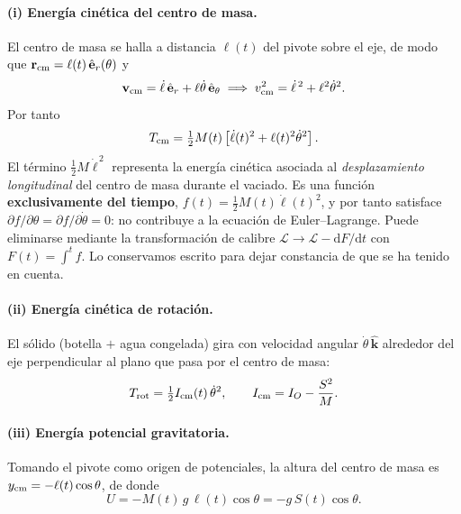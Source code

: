 \documentclass[11pt,a4paper]{article}
\newcommand{\dd}{\mathrm{d}}
\begin{document}
\paragraph{(i) Energía cinética del centro de masa.}
El centro de masa se halla a distancia $\ell(t)$ del pivote sobre el eje, de modo que
$\mathbf r_{\rm cm} = \ell(t)\,\hat{\mathbf e}_r(\theta)$ y
\begin{equation}
\mathbf v_{\rm cm} = \dot\ell\,\hat{\mathbf e}_r + \ell\dot\theta\,\hat{\mathbf e}_\theta
\;\Longrightarrow\;
v_{\rm cm}^2 = \dot\ell^{\,2} + \ell^2\dot\theta^2 .
\end{equation}
Por tanto
\begin{equation}
T_{\rm cm} = \tfrac12 M(t)\left[\dot\ell(t)^2 + \ell(t)^2\dot\theta^2\right].
\end{equation}
El término $\tfrac12 M\dot\ell^{\,2}$ representa la energía cinética asociada al
\emph{desplazamiento longitudinal} del centro de masa durante el vaciado. Es una función
\textbf{exclusivamente del tiempo}, $f(t)=\tfrac12 M(t)\dot\ell(t)^2$, y por tanto satisface
$\partial f/\partial\theta = \partial f/\partial\dot\theta = 0$: no contribuye a la ecuación de
Euler--Lagrange. Puede eliminarse mediante la transformación de calibre
$\mathcal L \to \mathcal L - \dd F/\dd t$ con $F(t)=\int^t f$. Lo conservamos escrito para dejar
constancia de que se ha tenido en cuenta.

\paragraph{(ii) Energía cinética de rotación.}
El sólido (botella $+$ agua congelada) gira con velocidad angular $\dot\theta\,\hat{\mathbf k}$
alrededor del eje perpendicular al plano que pasa por el centro de masa:
\begin{equation}
T_{\rm rot} = \tfrac12 I_{\rm cm}(t)\,\dot\theta^2,
\qquad I_{\rm cm} = I_O - \frac{S^2}{M}.
\end{equation}

\paragraph{(iii) Energía potencial gravitatoria.}
Tomando el pivote como origen de potenciales, la altura del centro de masa es
$y_{\rm cm} = -\ell(t)\cos\theta$, de donde
\begin{equation}
U = -M(t)\,g\,\ell(t)\cos\theta = -g\,S(t)\cos\theta .
\end{equation}
\end{document}
